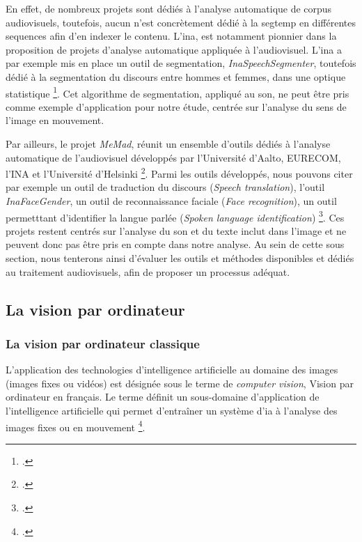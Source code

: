 En effet, de nombreux projets sont dédiés à l’analyse automatique de corpus audiovisuels, toutefois, aucun n’est concrètement dédié à la \gls{segtemp} en différentes \gls{sequence}s afin d'en indexer le contenu. L’\gls{ina}, est notamment pionnier dans la proposition de projets d’analyse automatique appliquée à l’audiovisuel. L’\gls{ina} a par exemple mis en place un outil de segmentation, \textit{InaSpeechSegmenter}, toutefois dédié à la segmentation du discours entre hommes et femmes, dans une optique statistique \footcite{zotero-item-787}. Cet algorithme de segmentation, appliqué au son, ne peut être pris comme exemple d’application pour notre étude, centrée sur l’analyse du sens de l’image en mouvement.  

Par ailleurs, le projet \textit{MeMad}, réunit un ensemble d’outils dédiés à l’analyse automatique de l’audiovisuel développés par l’Université d’Aalto, EURECOM, l’INA et l'Université d'Helsinki \footcite{zotero-item-790}. Parmi les outils développés, nous pouvons citer par exemple un outil de traduction du discours (\textit{Speech translation}), l’outil \textit{InaFaceGender}, un outil de reconnaissance faciale (\textit{Face recognition}), un outil permetttant d’identifier la langue parlée (\textit{Spoken language identification}) \footcite{zotero-item-790}. Ces projets restent centrés sur l’analyse du son et du texte inclut dans l’image et ne peuvent donc pas être pris en compte dans notre analyse. 
Au sein de cette sous section, nous tenterons ainsi d'évaluer les outils et méthodes disponibles et dédiés au traitement audiovisuels, afin de proposer un processus adéquat. 

\subsection{La vision par ordinateur}

\subsubsection{La vision par ordinateur classique}

L’application des technologies d’intelligence artificielle au domaine des images (images fixes ou vidéos) est désignée sous le terme de \textit{computer vision}, \gls{Vision par ordinateur} en français. Le terme définit un sous-domaine d’application de l’intelligence artificielle qui permet d’entraîner un système d’\gls{ia} à l’analyse des images fixes ou en mouvement \footcite{stryker2025}. 

